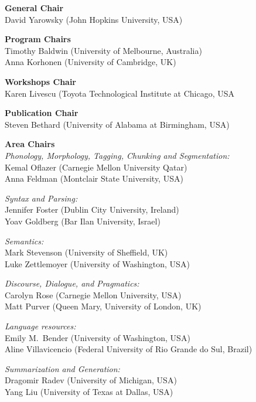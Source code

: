 \renewcommand{\leftheader}{EMNLP Organizing committee}
\renewcommand{\rightheader}{EMNLP Organizing committee}

\small
\noindent
\textbf{General Chair}\\
David Yarowsky (John Hopkins University, USA)

\smallskip
\noindent
\textbf{Program Chairs}\\
Timothy Baldwin (University of Melbourne, Australia)\\
Anna Korhonen (University of Cambridge, UK)

\smallskip
\noindent
\textbf{Workshops Chair}\\
Karen Livescu (Toyota Technological Institute at Chicago, USA

\smallskip
\noindent
\textbf{Publication Chair}\\
Steven Bethard (University of Alabama at Birmingham, USA)

\medskip
\noindent
\textbf{Area Chairs}\\
\textit{Phonology, Morphology, Tagging, Chunking and Segmentation:}\\
  Kemal Oflazer (Carnegie Mellon University Qatar)\\
  Anna Feldman (Montclair State University, USA)

\smallskip
\noindent
\textit{Syntax and Parsing:}\\
  Jennifer Foster (Dublin City University, Ireland)\\
  Yoav Goldberg (Bar Ilan University, Israel)

\smallskip
\noindent
\textit{Semantics:}\\
  Mark Stevenson (University of Sheffield, UK)\\
  Luke Zettlemoyer (University of Washington, USA)

\smallskip
\noindent
\textit{Discourse, Dialogue, and Pragmatics:}\\
  Carolyn Rose (Carnegie Mellon University, USA)\\
  Matt Purver (Queen Mary, University of London, UK)

\smallskip
\noindent
\textit{Language resources:}\\
  Emily M.\ Bender (University of Washington, USA)\\
  Aline Villavicencio (Federal University of Rio Grande do Sul, Brazil)

\smallskip
\noindent
\textit{Summarization and Generation:}\\
  Dragomir Radev (University of Michigan, USA)\\
  Yang Liu (University of Texas at Dallas, USA)

